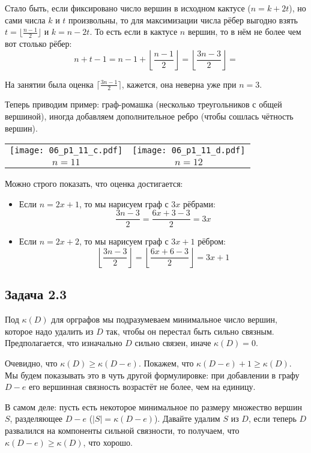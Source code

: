 	Стало быть, если фиксировано число вершин в исходном кактусе ($n=k+2t$), но сами
	числа $k$ и $t$ произвольны, то для максимизации числа рёбер выгодно взять
	$t=\lfloor \frac{n-1}{2} \rfloor$ и $k=n-2t$.
	То есть если в кактусе $n$ вершин, то в нём не более чем вот столько рёбер:
	\[
		n + t - 1 =
		n - 1 + \left\lfloor \frac{n-1}{2} \right\rfloor =
		\left\lfloor \frac{3n-3}{2} \right\rfloor =
	\]
	\begin{Rem}
		На занятии была оценка $\lceil \frac{3n-1}{2} \rceil$, кажется, она неверна
		уже при $n=3$.
	\end{Rem}
	
	Теперь приводим пример: граф-ромашка (несколько треугольников с общей вершиной),
	иногда добавляем дополнительное ребро (чтобы сошлась чётность вершин).
	\begin{center}
		\begin{tabular}{cc}
			\texttt{[image: 06\_p1\_11\_c.pdf]} &
			\texttt{[image: 06\_p1\_11\_d.pdf]} \\
			$n=11$ &
			$n=12$ \\
		\end{tabular}
	\end{center}
	Можно строго показать, что оценка достигается:
	\begin{itemize}
		\item
			Если $n=2x+1$, то мы нарисуем граф с $3x$ рёбрами:
			\[ \frac{3n-3}{2} = \frac{6x+3-3}{2} = 3x \]
		\item
			Если $n=2x+2$, то мы нарисуем граф с $3x+1$ рёбром:
			\[ \left\lfloor\frac{3n-3}{2}\right\rfloor = \left\lfloor\frac{6x+6-3}{2}\right\rfloor = 3x+1 \]
	\end{itemize}

\subsection{Задача 2.3}
	\begin{Rem}
		Под $\kappa(D)$ для орграфов мы подразумеваем минимальное число вершин, которое надо удалить из $D$
		так, чтобы он перестал быть сильно связным.
		Предполагается, что изначально $D$ сильно связен, иначе $\kappa(D)=0$.
	\end{Rem}
	Очевидно, что $\kappa(D) \ge \kappa(D - e)$.
	Покажем, что $\kappa(D - e) + 1 \ge \kappa(D)$.
	Мы будем показывать это в чуть другой формулировке: при добавлении в графу $D-e$ его вершинная связность
	возрастёт не более, чем на единицу.

	В самом деле: пусть есть некоторое минимальное по размеру множество вершин $S$, разделяющее $D-e$ ($|S|=\kappa(D - e)$).
	Давайте удалим $S$ из $D$, если теперь $D$ развалился на компоненты сильной связности, то получаем,
	что $\kappa(D - e) \ge \kappa(D)$, что хорошо.

